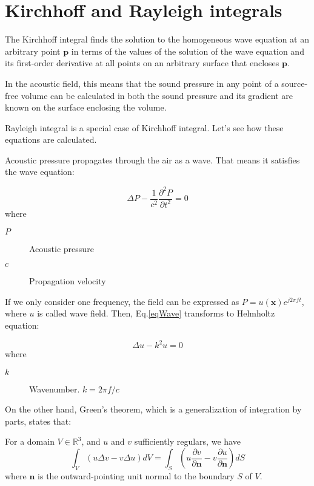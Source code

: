 \chapter{Kirchhoff and Rayleigh integrals}

The Kirchhoff integral finds the solution to the homogeneous wave equation at an arbitrary point $\mathbf{p}$ in terms of the values of the solution of the wave equation and its first-order derivative at all points on an arbitrary surface that encloses $\mathbf{p}$.

In the acoustic field, this means that the sound pressure in any point of a source-free volume can be calculated in both the sound pressure and its gradient are known on the surface enclosing the volume. 

Rayleigh integral is a special case of Kirchhoff integral. Let's see how these equations are calculated.

Acoustic pressure propagates through the air as a wave. That means it satisfies the wave equation:

\begin{equation}
\Delta P - \frac{1}{c^2}\frac{\partial^2 P}{\partial t^2} = 0
\label{eqWave}
\end{equation}
where
\begin{description}
	\item[$P$] Acoustic pressure
	\item[$c$] Propagation velocity
\end{description}

If we only consider one frequency, the field can be expressed as $P = u(\mathbf{x})e^{j 2\pi f t}$, where $u$ is called wave field. Then, Eq.\ref{eqWave} transforms to Helmholtz equation:

\begin{equation}
\Delta u - k^2 u = 0
\label{eqHelmholtz}
\end{equation}
where
\begin{description}
	\item[$k$] Wavenumber. $k = 2\pi f/c$
\end{description}

On the other hand, Green’s theorem, which is a generalization of integration by parts, states that:

\begin{theorem}
	\label{theoGreen}
	For a domain $V \in \mathbb{R}^3$, and $u$ and $v$ sufficiently regulars, we have
	\begin{equation}
	\int_{V} \left( u \Delta v - v \Delta u \right) dV = \int_{S} \left(u\frac{\partial v}{\partial \mathbf{n}} - v \frac{\partial u}{\partial \mathbf{n}}\right) dS
	\label{eqGreen}
	\end{equation}
	where $\mathbf{n}$ is the outward-pointing unit normal to the boundary $S$ of $V$.
\end{theorem}

